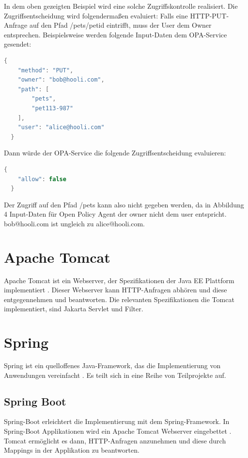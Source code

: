In dem oben gezeigten Beispiel \citep{opaplayground:2021} wird eine solche Zugriffskontrolle realisiert. Die 
Zugriffsentscheidung wird folgendermaßen evaluiert:
Falls eine HTTP-PUT-Anfrage auf den Pfad /pets/{petid} eintrifft, muss der User dem 
Owner entsprechen. Beispielsweise werden folgende Input-Daten dem OPA-Service gesendet:

\begin{lstlisting}[language=C++,frame=tb,caption={Input-Daten für Open Policy Agent},label=lst:Input-DatenfürOpenPolicyAgent]
  {
    "method": "PUT",
    "owner": "bob@hooli.com",
    "path": [
        "pets",
        "pet113-987"
    ],
    "user": "alice@hooli.com"
  }
\end{lstlisting}

Dann würde der OPA-Service die folgende Zugriffsentscheidung evaluieren:

\begin{lstlisting}[language=C++,frame=tb,caption={Zugriffsentscheidung in Rego},label=lst:ZugriffsentscheidunginRego]
  {
    "allow": false
  }
\end{lstlisting}

Der Zugriff auf den Pfad /pets kann also nicht gegeben werden, da in Abbildung 4 Input-Daten für Open Policy Agent der owner nicht dem user entspricht. bob@hooli.com ist ungleich zu alice@hooli.com. 

\section{Apache Tomcat}
Apache Tomcat ist ein Webserver, der Spezifikationen der Java EE Plattform implementiert
\citep{tomcat:2021}. Dieser Webserver kann HTTP-Anfragen abhören und diese entgegennehmen und 
beantworten. Die relevanten Spezifikationen die Tomcat implementiert, sind Jakarta Servlet
und Filter. 

\section{Spring}
Spring ist ein quelloffenes Java-Framework, das die Implementierung von Anwendungen 
vereinfacht \citep{spring:2021}. Es teilt sich in eine Reihe von Teilprojekte auf. 

\subsection{Spring Boot}
Spring-Boot erleichtert die Implementierung mit dem Spring-Framework. In Spring-Boot Applikationen wird ein Apache Tomcat Webserver eingebettet \citep{springboot:2021}. Tomcat ermöglicht es dann, HTTP-Anfragen anzunehmen und diese durch Mappings in der Applikation zu beantworten.

